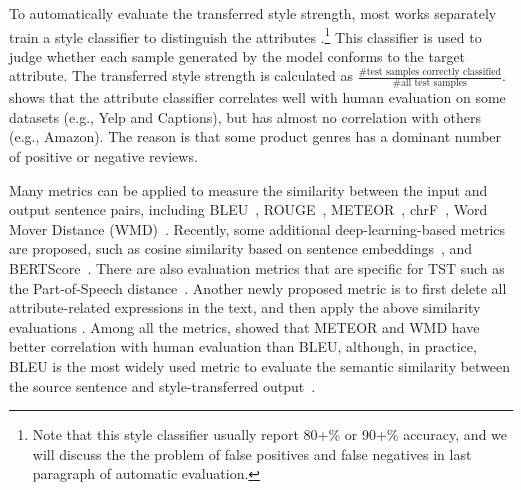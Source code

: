 To automatically evaluate the transferred style strength, most works separately train a style classifier to distinguish the attributes .\footnote{Note that this style classifier usually report 80+\% or 90+\% accuracy, and we will discuss the the problem of false positives and false negatives in last paragraph of automatic evaluation.} This classifier is used to judge whether each sample generated by the model conforms to the target attribute. The transferred style strength is calculated as $\frac{\text{\# test samples correctly classified}}{\text{\# all test samples}}$.  shows that the attribute classifier correlates well with human evaluation on some datasets (e.g., Yelp and Captions), but has almost no correlation with others (e.g., Amazon). The reason is that some product genres has a dominant number of positive or negative reviews.

Many metrics can be applied to measure the similarity between the input and output sentence pairs, including BLEU~, ROUGE~, METEOR~, chrF~, Word Mover Distance (WMD)~. Recently, some additional deep-learning-based metrics are proposed, such as cosine similarity based on sentence embeddings~, and BERTScore~. There are also evaluation metrics that are specific for TST such as the Part-of-Speech distance~. Another newly proposed metric is to first delete all attribute-related expressions in the text, and then apply the above similarity evaluations .
Among all the metrics,  showed that METEOR and WMD have better correlation with human evaluation than BLEU, although, in practice, BLEU is the most widely used metric to evaluate the semantic similarity between the source sentence and style-transferred output~.

